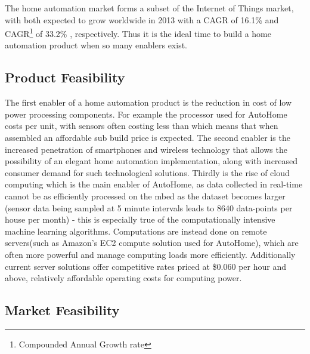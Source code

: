 \documentclass[10.5pt,a4paper,twoside]{report}   %
\begin{document}
The home automation market forms a subset of the Internet of Things market, with both expected to grow worldwide in 2013 with a CAGR of 16.1\%\cite{mandmhomeauto} and CAGR\footnote{Compounded Annual Growth rate} of 33.2\%\cite{mandmiot} , respectively. Thus it is the ideal time to build a home automation product when so many enablers exist.
\subsection{Product Feasibility}

The first enabler of a home automation product is the reduction in cost of low power processing components. For example the processor used for AutoHome costs  per unit\cite{farnellnxplpc}, with sensors often costing less than  which means that when assembled an affordable sub  build price is expected. The second enabler is the increased penetration of smartphones and wireless technology that allows the possibility of an elegant home automation implementation, along with increased consumer demand for such technological solutions. Thirdly is the rise of cloud computing which is the main enabler of AutoHome, as data collected in real-time cannot be as efficiently processed on the mbed as the dataset becomes larger (sensor data being sampled at 5 minute intervals leads to 8640 data-points per house per month) - this is especially true of the computationally intensive machine learning algorithms. Computations are instead done on remote servers(such as Amazon's EC2 compute solution used for AutoHome), which are often more powerful and manage computing loads more efficiently. Additionally current server solutions offer competitive rates priced at \$0.060 per hour and above, relatively affordable operating costs for computing power.
\subsection{Market Feasibility}
\end{document}
